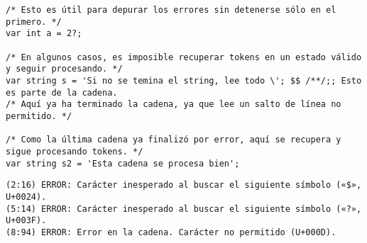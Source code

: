 \documentclass{article}
\begin{document}
\begin{enumerate}
\begin{tcolorbox}[title={Código fuente}, colback=white]
\begin{lstlisting}
/* Esto es útil para depurar los errores sin detenerse sólo en el primero. */
var int a = 2?;

/* En algunos casos, es imposible recuperar tokens en un estado válido y seguir procesando. */
var string s = 'Si no se temina el string, lee todo \'; $$ /**/;; Esto es parte de la cadena.
/* Aquí ya ha terminado la cadena, ya que lee un salto de línea no permitido. */

/* Como la última cadena ya finalizó por error, aquí se recupera y sigue procesando tokens. */
var string s2 = 'Esta cadena se procesa bien';
        \end{lstlisting}      
    \end{tcolorbox}

    \begin{tcolorbox}[title={Errores detectados}, colback=white]
        \begin{lstlisting}
(2:16) ERROR: Carácter inesperado al buscar el siguiente símbolo («$», U+0024).
(5:14) ERROR: Carácter inesperado al buscar el siguiente símbolo («?», U+003F).
(8:94) ERROR: Error en la cadena. Carácter no permitido (U+000D).
        \end{lstlisting}
    \end{tcolorbox}

\end{enumerate}
\end{document}
